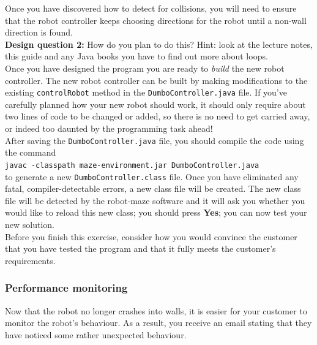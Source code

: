 \noindent
Once you have discovered how to detect for collisions, you will need to
ensure that the robot controller keeps choosing directions for the 
robot until a non-wall direction is found. \\

\noindent
{\bf Design question 2:}
How do you plan to do this? Hint:
look at the lecture notes, this guide and any Java books you have to find out
more about loops. \\

\noindent
Once you have designed the program you are ready to {\em build} the
new robot controller. 
The new robot controller can be built by making modifications 
to the existing {\tt controlRobot}
method in the {\tt DumboController.java} file. If you've carefully planned
how your new robot should work, it should only require about two
lines of code to be changed or added, so there is no need to get
carried away, or indeed too daunted by the programming task ahead!\\

\noindent
After saving the {\tt DumboController.java} file, you should compile the 
code using the command\\

{\tt javac -classpath maze-environment.jar DumboController.java}\\

\noindent
to generate a new {\tt DumboController.class} file. 
Once you have eliminated any fatal,
compiler-detectable errors, a new class file will be created. 
The new class file will be detected by the robot-maze software and it will 
ask you whether you would like to reload this new class; you should 
press {\bf Yes}; you can now test your new solution. \\

\noindent
Before you finish this exercise, consider how you would convince the
customer that you have tested the program and that it fully meets the
customer's requirements. 

\subsubsection{Performance monitoring}

Now that the robot no longer crashes into walls, it is easier for your
customer to monitor the robot's behaviour. As a result, you receive
an email stating that they have noticed some rather unexpected behaviour. \\

